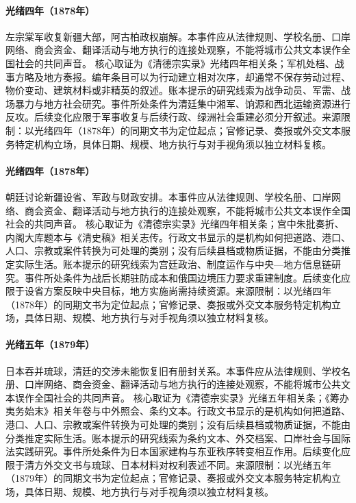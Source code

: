 \hypertarget{civic:EQ-1878-Zuo-ZONGTANG-XINJIANG}{}\paragraph{光绪四年（1878年）}左宗棠军收复新疆大部，阿古柏政权崩解。本事件应从法律规则、学校名册、口岸网络、商会资金、翻译活动与地方执行的连接处观察，不能将城市公共文本误作全国社会的共同声音。 核心取证为《清德宗实录》光绪四年相关条；军机处档、战事方略及地方奏报。编年条目可以为行动建立相对次序，却通常不保存劳动过程、物价变动、建筑材料或非精英的叙述。账本提示的研究线索为战争动员、军需、战场暴力与地方社会研究。事件所处条件为清廷集中湘军、饷源和西北运输资源进行反攻。后续变化应限于军事收复与后续行政、绿洲社会重建必须分开叙述。来源限制：以光绪四年（1878年）的同期文书为定位起点；官修记录、奏报或外交文本服务特定机构立场，具体日期、规模、地方执行与对手视角须以独立材料复核。
\hypertarget{civic:EQ-1878-XINJIANG-PROVINCE-DEBATE}{}\paragraph{光绪四年（1878年）}朝廷讨论新疆设省、军政与财政安排。本事件应从法律规则、学校名册、口岸网络、商会资金、翻译活动与地方执行的连接处观察，不能将城市公共文本误作全国社会的共同声音。 核心取证为《清德宗实录》光绪四年相关条；宫中朱批奏折、内阁大库题本与《清史稿》相关志传。行政文书显示的是机构如何把道路、港口、人口、宗教或案件转换为可处理的类别；没有后续县档或物质证据，不能由分类推定实际生活。账本提示的研究线索为宫廷政治、制度运作与中央—地方信息链研究。事件所处条件为战后长期驻防成本和俄国边境压力要求重建制度。后续变化应限于设省方案反映中央目标，地方实施尚需持续资源。来源限制：以光绪四年（1878年）的同期文书为定位起点；官修记录、奏报或外交文本服务特定机构立场，具体日期、规模、地方执行与对手视角须以独立材料复核。
\hypertarget{civic:EQ-1879-RYUKYU-ANNEXATION}{}\paragraph{光绪五年（1879年）}日本吞并琉球，清廷的交涉未能恢复旧有册封关系。本事件应从法律规则、学校名册、口岸网络、商会资金、翻译活动与地方执行的连接处观察，不能将城市公共文本误作全国社会的共同声音。 核心取证为《清德宗实录》光绪五年相关条；《筹办夷务始末》相关年卷与中外照会、条约文本。行政文书显示的是机构如何把道路、港口、人口、宗教或案件转换为可处理的类别；没有后续县档或物质证据，不能由分类推定实际生活。账本提示的研究线索为条约文本、外交档案、口岸社会与国际法实践研究。事件所处条件为日本国家建构与东亚秩序转变相互作用。后续变化应限于清方外交文书与琉球、日本材料对权利表述不同。来源限制：以光绪五年（1879年）的同期文书为定位起点；官修记录、奏报或外交文本服务特定机构立场，具体日期、规模、地方执行与对手视角须以独立材料复核。
